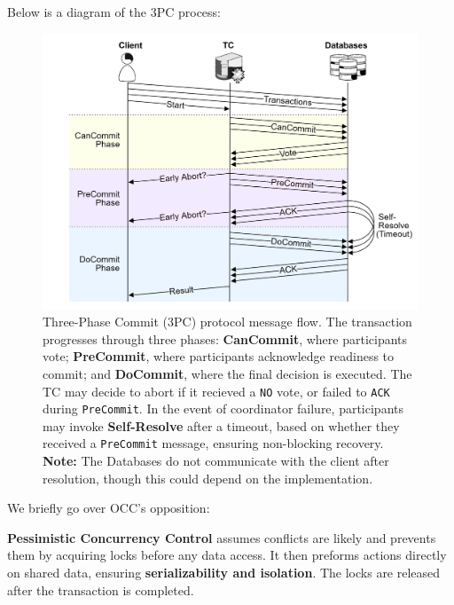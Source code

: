 \noindent
Below is a diagram of the 3PC process:
\begin{figure}[h]
    \centering
    \includegraphics[width=\textwidth]{Sections/trans/3PC.png}
    \caption{Three-Phase Commit (3PC) protocol message flow. The transaction progresses through three phases: \textbf{CanCommit}, where participants vote; \textbf{PreCommit}, where participants acknowledge readiness to commit; and \textbf{DoCommit}, where the final decision is executed. The TC may decide to abort if it recieved a \texttt{NO} vote, or failed to \texttt{ACK} during \texttt{PreCommit}. In the event of coordinator failure, participants may invoke \textbf{Self-Resolve} after a timeout, based on whether they received a \texttt{PreCommit} message, ensuring non-blocking recovery.
    \textbf{Note:} The Databases do not communicate with the client after resolution, though this could depend on the implementation.}
    \label{fig:3pc}
\end{figure}

\noindent
We briefly go over OCC's opposition:
\begin{Def}

    \textbf{Pessimistic Concurrency Control} assumes conflicts are likely and prevents them by acquiring locks before any data access.
    It then preforms actions directly on shared data, ensuring \textbf{serializability and isolation}. The locks are released after the transaction is completed.
  \end{Def}
  
